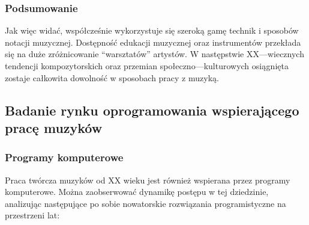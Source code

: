 \documentclass[12pt]{article}
\begin{document}
\subsubsection{Podsumowanie}
Jak więc widać, współcześnie wykorzystuje się szeroką gamę technik i sposobów notacji muzycznej. Dostępność edukacji muzycznej
oraz instrumentów przekłada się na duże zróżnicowanie \enquote{warsztatów} artystów. W następstwie XX—wiecznych tendencji kompozytorskich
oraz przemian społeczno—kulturowych osiągnięta zostaje całkowita dowolność w sposobach pracy z muzyką.

\subsection{Badanie rynku oprogramowania wspierającego pracę muzyków}
\subsubsection{Programy komputerowe}
Praca twórcza muzyków od XX wieku jest również wspierana przez programy komputerowe. Można zaobserwować dynamikę postępu
w tej dziedzinie, analizując następujące po sobie nowatorskie rozwiązania programistyczne na przestrzeni lat:
\end{document}
